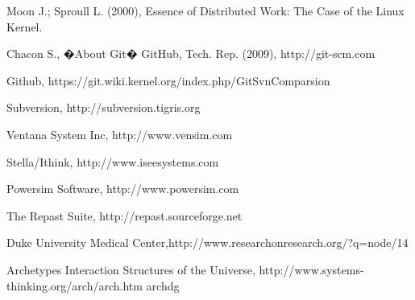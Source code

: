 \documentclass[11pt]{article}
\begin{document}
\begin{thebibliography}{}
Moon J.; Sproull L. (2000), Essence of Distributed Work: The Case of the Linux Kernel. 

 Chacon S., �About Git� GitHub, Tech. Rep. (2009), http://git-scm.com

Github, https://git.wiki.kernel.org/index.php/GitSvnComparsion

Subversion, http://subversion.tigris.org

Ventana System Inc,  http://www.vensim.com

Stella/Ithink,  http://www.iseesystems.com

 Powersim Software,  http://www.powersim.com

The Repast Suite,   http://repast.sourceforge.net 

Duke University Medical Center,http://www.researchonresearch.org/?q=node/14

Archetypes Interaction Structures of the Universe, http://www.systems-thinking.org/arch/arch.htm archdg 

\end{thebibliography}
\end{document}
